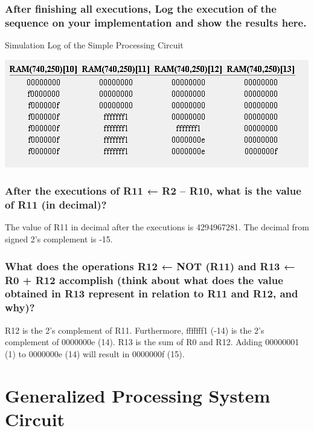 \documentclass{article}
\begin{document}
		\subsubsection{After finishing all executions, Log the execution of the sequence on your implementation and show the results here.}		
		\begin{table}[!ht]
			\centering
			\caption{Simulation Log of the Simple Processing Circuit}
			\vspace{0.2cm}
			\includegraphics[width=0.8\linewidth]{log_sim_table_part1.png}
		\end{table}
	
		\subsubsection{After the executions of R11 ← R2 – R10, what is the value of R11 (in decimal)?}
		The value of R11 in decimal after the executions is 4294967281. The decimal from signed 2's complement is -15.
		
		\subsubsection{What does the operations R12 ← NOT (R11) and R13 ← R0 + R12 accomplish (think about what does the value obtained in R13 represent in relation to R11 and R12, and why)?}
		R12 is the 2's complement of R11. Furthermore, fffffff1 (-14) is the 2's complement of 0000000e (14).
		R13 is the sum of R0 and R12. Adding 00000001 (1) to 0000000e (14) will result in 0000000f (15).
		
		\pagebreak
		
		\section{Generalized Processing System Circuit}
		
\end{document}

